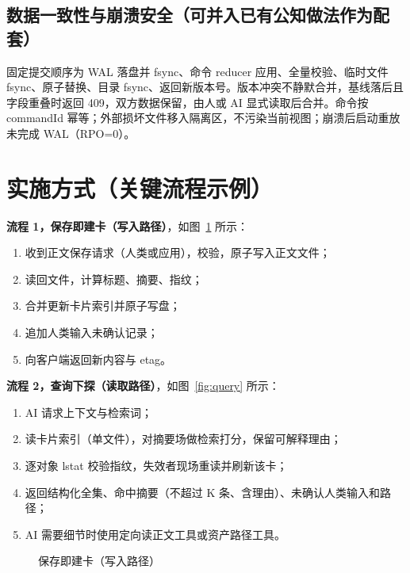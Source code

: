 \documentclass[12pt,a4paper]{article}
\begin{document}
\subsection{数据一致性与崩溃安全（可并入已有公知做法作为配套）}
固定提交顺序为 WAL 落盘并 fsync、命令 reducer 应用、全量校验、临时文件 fsync、原子替换、目录 fsync、返回新版本号。版本冲突不静默合并，基线落后且字段重叠时返回 409，双方数据保留，由人或 AI 显式读取后合并。命令按 commandId 幂等；外部损坏文件移入隔离区，不污染当前视图；崩溃后启动重放未完成 WAL（RPO=0）。

\section{实施方式（关键流程示例）}
\textbf{流程 1，保存即建卡（写入路径）}，如图~\ref{fig:save} 所示：
\begin{enumerate}[leftmargin=2em,itemsep=2pt]
\item 收到正文保存请求（人类或应用），校验，原子写入正文文件；
\item 读回文件，计算标题、摘要、指纹；
\item 合并更新卡片索引并原子写盘；
\item 追加人类输入未确认记录；
\item 向客户端返回新内容与 etag。
\end{enumerate}

\textbf{流程 2，查询下探（读取路径）}，如图~\ref{fig:query} 所示：
\begin{enumerate}[leftmargin=2em,itemsep=2pt]
\item AI 请求上下文与检索词；
\item 读卡片索引（单文件），对摘要场做检索打分，保留可解释理由；
\item 逐对象 lstat 校验指纹，失效者现场重读并刷新该卡；
\item 返回结构化全集、命中摘要（不超过 K 条、含理由）、未确认人类输入和路径；
\item AI 需要细节时使用定向读正文工具或资产路径工具。
\end{enumerate}

\begin{figure}[ht]
\centering
{}
\caption{保存即建卡（写入路径）}\label{fig:save}
\end{figure}
\end{document}
